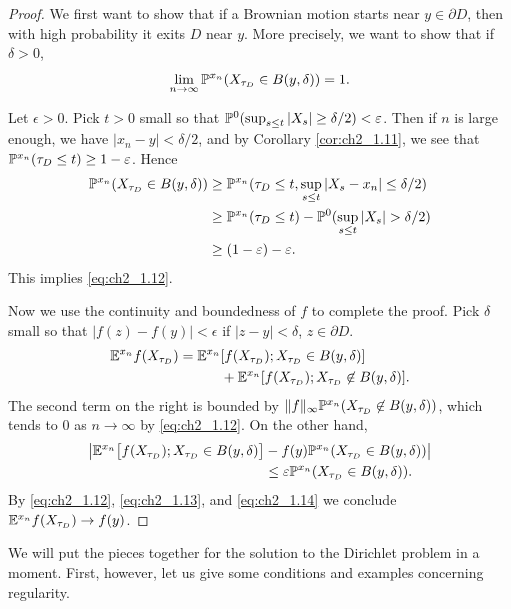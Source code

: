 \begin{proof}
We first want to show that if a Brownian motion starts near $y \in \partial D$, then with high probability it exits $D$ near $y$. More precisely, we want to show that if $\delta > 0$,
\begin{equation}\label{eq:ch2_1.12}
    \lim_{n\to\infty} \P^{x_n}(X_{\tau_D} \in B(y,\delta)) = 1.
\end{equation}

Let $\epsilon > 0$. Pick $t > 0$ small so that $\P^0(\sup_{s\leq t} |X_s| \geq \delta/2) < \epsilon$. Then if $n$ is large enough, we have $|x_n - y| < \delta/2$, and by Corollary \ref{cor:ch2_1.11}, we see that $\P^{x_n}(\tau_D \leq t) \geq 1-\epsilon$. Hence
\begin{align*}
    \P^{x_n}(X_{\tau_D} \in B(y,\delta)) &\geq \P^{x_n}(\tau_D \leq t, \sup_{s\leq t} |X_s - x_n| \leq \delta/2) \\
    &\geq \P^{x_n}(\tau_D \leq t) - \P^0(\sup_{s\leq t} |X_s| > \delta/2) \\
    &\geq (1-\epsilon) - \epsilon.
\end{align*}
This implies \eqref{eq:ch2_1.12}.

Now we use the continuity and boundedness of $f$ to complete the proof. Pick $\delta$ small so that $|f(z) - f(y)| < \epsilon$ if $|z-y| < \delta$, $z \in \partial D$.
\begin{align}\label{eq:ch2_1.13}
    \E^{x_n}f(X_{\tau_D}) &= \E^{x_n}[f(X_{\tau_D}); X_{\tau_D} \in B(y,\delta)] \\
    &\qquad\quad+ \E^{x_n}[f(X_{\tau_D}); X_{\tau_D} \not\in B(y,\delta)]. \notag
\end{align}
The second term on the right is bounded by $\|f\|_\infty\P^{x_n}(X_{\tau_D} \not\in B(y,\delta))$, which tends to $0$ as $n \to \infty$ by \eqref{eq:ch2_1.12}. On the other hand,
\begin{align}\label{eq:ch2_1.14}
    \big|\E^{x_n}\big[f(X_{\tau_D}); X_{\tau_D} \in B(y,\delta)\big] &- f(y)\P^{x_n}(X_{\tau_D} \in B(y,\delta))\big| \\
    &\leq \epsilon\P^{x_n}(X_{\tau_D} \in B(y,\delta)). \notag
\end{align}
By \eqref{eq:ch2_1.12}, \eqref{eq:ch2_1.13}, and \eqref{eq:ch2_1.14} we conclude $\E^{x_n}f(X_{\tau_D}) \to f(y)$.
\end{proof}

We will put the pieces together for the solution to the Dirichlet problem in a moment. First, however, let us give some conditions and examples concerning regularity.

